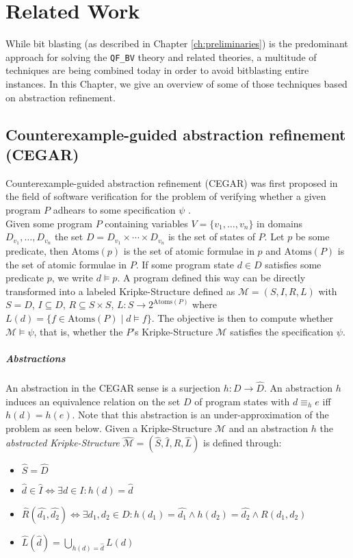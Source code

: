 \chapter{Related Work}
\label{ch:related_work}
While bit blasting (as described in Chapter \ref{ch:preliminaries}) is the predominant approach for solving the \texttt{QF\_BV} theory and related theories, a multitude of techniques are being combined today in order to avoid bitblasting entire instances.
In this Chapter, we give an overview of some of those techniques based on abstraction refinement.

\section{Counterexample-guided abstraction refinement (CEGAR)}
Counterexample-guided abstraction refinement (CEGAR) was first proposed in the field of software verification for the problem of verifying whether a given program $P$ adhears to some specification $\psi$ \cite{CEGAR}.\\
Given some program $P$ containing variables $V=\{v_1,\dots,v_n\}$ in domains $D_{v_1},\dots,D_{v_n}$ the set $D=D_{v_1}\times\dotsi\times D_{v_n}$ is the set of states of $P$. Let $p$ be some predicate, then $\text{Atoms}\left(p\right)$ is the set of atomic formulae in $p$ and $\text{Atoms}\left(P\right)$ is the set of atomic formulae in $P$. If some program state $d\in D$ satisfies some predicate $p$, we write $d\vDash p$. A program defined this way can be directly transformed into a labeled Kripke-Structure defined as $\mathcal{M}=\left(S,I,R,L\right)$ with $S=D$, $I\subseteq D$, $R \subseteq S \times S$, $L\colon S \to 2^{\text{Atoms}\left(P\right)}$ where $L\left(d\right) = \{ f \in \text{Atoms}\left(P\right) \mid d \vDash f \}$. The objective is then to compute whether $\mathcal{M}\vDash\psi$, that is, whether the $P$'s Kripke-Structure $\mathcal{M}$ satisfies the specification $\psi$.
\paragraph{Abstractions}
An abstraction in the CEGAR sense is a surjection $h\colon D \to \hat{D}$. An abstraction $h$ induces an equivalence relation on the set $D$ of program states with $d \equiv_h e$ iff $h\left(d\right) = h\left(e\right)$.  Note that this abstraction is an under-approximation of the problem as seen below. Given a Kripke-Structure $\mathcal{M}$ and an abstraction $h$ the \textit{abstracted Kripke-Structure} $\hat{\mathcal{M}} = \left(\hat{S},\hat{I},\hat{R},\hat{L}\right)$ is defined through:
\begin{itemize}
    \item $\hat{S} = \hat{D}$
    \item $\hat{d} \in \hat{I} \iff \exists d \in I\colon h\left(d\right) = \hat{d}$
    \item $\hat{R}\left(\hat{d_1},\hat{d_2}\right) \iff \exists d_1,d_2 \in D\colon h\left(d_1\right) = \hat{d_1} \land h\left(d_2\right) = \hat{d_2} \land R\left(d_1, d_2\right)$
    \item $\hat{L}\left(\hat{d}\right)=\bigcup\limits_{h\left(d\right)=\hat{d}} L\left(d\right)$
\end{itemize}

